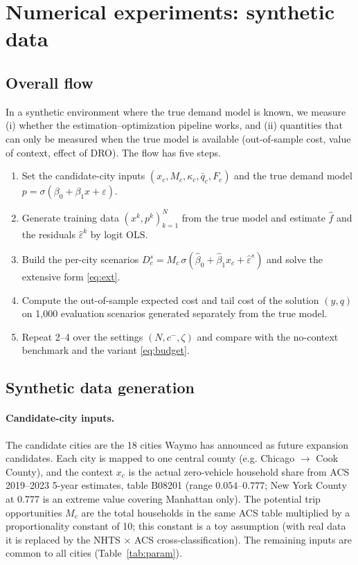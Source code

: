 \documentclass[10pt,a4paper]{article}
\begin{document}
\section{Numerical experiments: synthetic data}

\subsection{Overall flow}

In a synthetic environment where the true demand model is known, we measure (i) whether the estimation--optimization pipeline works, and (ii) quantities that can only be measured when the true model is available (out-of-sample cost, value of context, effect of DRO). The flow has five steps.
\begin{enumerate}[nosep]
  \item Set the candidate-city inputs $(x_c, M_c, \kappa_c, \bar q_c, F_c)$ and the true demand model $p=\sigma(\beta_0+\beta_1 x+\varepsilon)$.
  \item Generate training data $(x^k,p^k)_{k=1}^N$ from the true model and estimate $\hat f$ and the residuals $\hat\varepsilon^k$ by logit OLS.
  \item Build the per-city scenarios $D_c^s=M_c\,\sigma(\hat\beta_0+\hat\beta_1x_c+\hat\varepsilon^s)$ and solve the extensive form \eqref{eq:ext}.
  \item Compute the out-of-sample expected cost and tail cost of the solution $(y,q)$ on 1{,}000 evaluation scenarios generated separately from the true model.
  \item Repeat 2--4 over the settings $(N, c^-, \zeta)$ and compare with the no-context benchmark and the variant \eqref{eq:budget}.
\end{enumerate}

\subsection{Synthetic data generation}\label{sec:data}

\paragraph{Candidate-city inputs.}
The candidate cities are the 18 cities Waymo has announced as future expansion candidates. Each city is mapped to one central county (e.g. Chicago $\to$ Cook County), and the context $x_c$ is the actual zero-vehicle household share from ACS 2019--2023 5-year estimates, table B08201 (range $0.054$--$0.777$; New York County at 0.777 is an extreme value covering Manhattan only). The potential trip opportunities $M_c$ are the total households in the same ACS table multiplied by a proportionality constant of 10; this constant is a toy assumption (with real data it is replaced by the NHTS $\times$ ACS cross-classification). The remaining inputs are common to all cities (Table~\ref{tab:param}).
\end{document}
